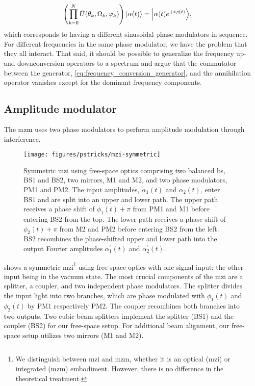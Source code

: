 \begin{equation}
	\left(
		\prod^N_{k=0}
		\hat{U}(\theta_k,\Omega_k,\varphi_k)
	\right)
	\ket*{\alpha(t)}
	=
	\ket*{\alpha(t)e^{+i\varphi(t)}}
	,
\end{equation}
which corresponds to having a different sinusoidal phase modulators in sequence.
For different frequencies in the same phase modulator, we have the problem that they all interact.
That said, it should be possible to generalize the frequency up- and downconversion operators to a spectrum and argue that the commutator between the generator, \cref{eq:frequency_conversion_generator}, and the annihilation operator vanishes except for the dominant frequency components.

\subsection{Amplitude modulator}

The \gls{mzm} uses two phase modulators to perform amplitude modulation through interference.
\begin{figure}[htb]
	\centering
	\texttt{[image: figures/pstricks/mzi-symmetric]}
	\caption{Symmetric \gls{mzi} using free-space optics comprising two balanced \gls{bs}, BS1 and BS2, two mirrors, M1 and M2, and two phase modulators, PM1 and PM2. The input amplitudes, $\alpha_1(t)$ and $\alpha_2(t)$, enter BS1 and are split into an upper and lower path. The upper path receives a phase shift of $\phi_1(t)+\pi$ from PM1 and M1 before entering BS2 from the top. The lower path receives a phase shift of $\phi_2(t)+\pi$ from M2 and PM2 before entering BS2 from the left. BS2 recombines the phase-shifted upper and lower path into the output Fourier amplitudes $\alpha_1^\prime(t)$ and $\alpha_2^\prime(t)$.}\label{fig:mzi_symmetric}
\end{figure}
 shows a symmetric \gls{mzi}\footnote{We distinguish between \gls{mzi} and \gls{mzm}, whether it is an optical (\gls{mzi}) or integrated (\gls{mzm}) embodiment. However, there is no difference in the theoretical treatment.} using free-space optics with one signal input; the other input being in the vacuum state.
The most crucial components of the \gls{mzi} are a splitter, a coupler, and two independent phase modulators.
The splitter divides the input light into two branches, which are phase modulated with $\phi_1(t)$ and $\phi_2(t)$ by PM1 respectively PM2.
The coupler recombines both branches into two outputs.
Two cubic beam splitters implement the splitter (BS1) and the coupler (BS2) for our free-space setup.
For additional beam alignment, our free-space setup utilizes two mirrors (M1 and M2).

